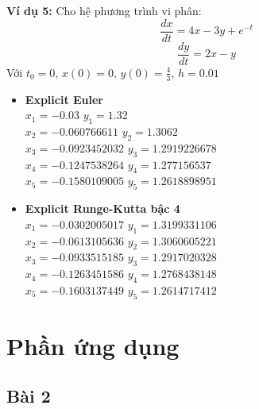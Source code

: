 \documentclass[a4paper]{article}
\begin{document}
\begin{flushleft}
    \textbf{Ví dụ 5: }
    Cho hệ phương trình vi phân: 
        \[\frac{dx}{dt} = 4x - 3y + e^{-t}\]
        \[\frac{dy}{dt} = 2x - y\]
    Với $t_0=0$, $x(0) = 0$, $y(0) = \frac{4}{3}$, $h=0.01$
    \begin{itemize}
        \item \textbf{Explicit Euler \\}
        $x_1=-0.03$ \hspace{2.55cm} $y_1=1.32$ \\
        $x_2=-0.060766611$ \hspace{1.33cm} $y_2=1.3062$ \\
        $x_3=-0.0923452032$ \hspace{1.15cm} $y_3=1.2919226678$ \\
        $x_4=-0.1247538264$ \hspace{1.15cm} $y_4=1.277156537$ \\
        $x_5=-0.1580109005$ \hspace{1.15cm} $y_5=1.2618898951$
    \end{itemize}
    
    \begin{itemize}
        \item \textbf{Explicit Runge-Kutta bậc 4 \\}
        $x_1=-0.0302005017$ \hspace{1.15cm} $y_1=1.3199331106$ \\
        $x_2=-0.0613105636$ \hspace{1.15cm} $y_2=1.3060605221$ \\
        $x_3=-0.0933515185$ \hspace{1.15cm} $y_3=1.2917020328$ \\
        $x_4=-0.1263451586$ \hspace{1.15cm} $y_4=1.2768438148$ \\
        $x_5=-0.1603137449$ \hspace{1.15cm} $y_5=1.2614717412$
    \end{itemize}
\end{flushleft}


\section{Phần ứng dụng}
	\subsection{Bài 2}
	    
\end{document}

